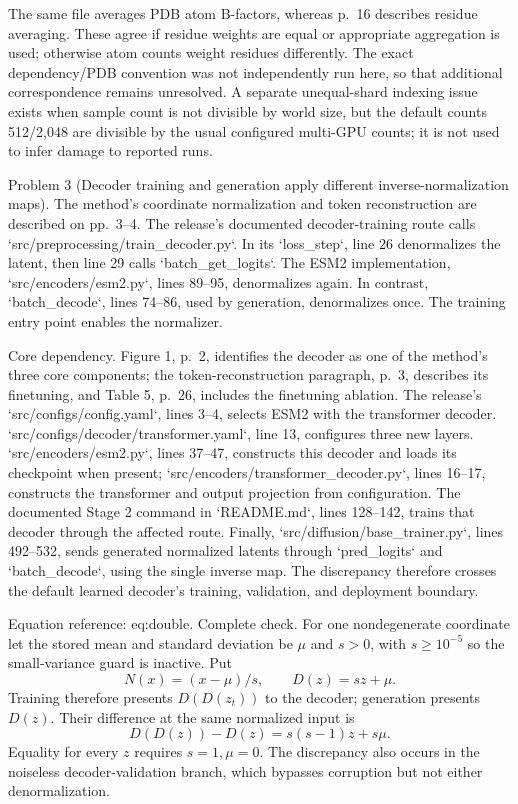 \documentclass[10pt]{article}
\begin{document}
The same file averages PDB atom B-factors, whereas p. 16 describes residue averaging. These agree if residue weights are equal or appropriate aggregation is used; otherwise atom counts weight residues differently. The exact dependency/PDB convention was not independently run here, so that additional correspondence remains unresolved. A separate unequal-shard indexing issue exists when sample count is not divisible by world size, but the default counts 512/2,048 are divisible by the usual configured multi-GPU counts; it is not used to infer damage to reported runs.\par
Problem 3 (Decoder training and generation apply different inverse-normalization maps).  The method’s coordinate normalization and token reconstruction are described on pp. 3–4. The release’s documented decoder-training route calls `src/preprocessing/train\_decoder.py`. In its `loss\_step`, line 26 denormalizes the latent, then line 29 calls `batch\_get\_logits`. The ESM2 implementation, `src/encoders/esm2.py`, lines 89–95, denormalizes again. In contrast, `batch\_decode`, lines 74–86, used by generation, denormalizes once. The training entry point enables the normalizer.\par
Core dependency. Figure 1, p. 2, identifies the decoder as one of the method’s three core components; the token-reconstruction paragraph, p. 3, describes its finetuning, and Table 5, p. 26, includes the finetuning ablation. The release’s `src/configs/config.yaml`, lines 3–4, selects ESM2 with the transformer decoder. `src/configs/decoder/transformer.yaml`, line 13, configures three new layers. `src/encoders/esm2.py`, lines 37–47, constructs this decoder and loads its checkpoint when present; `src/encoders/transformer\_decoder.py`, lines 16–17, constructs the transformer and output projection from configuration. The documented Stage 2 command in `README.md`, lines 128–142, trains that decoder through the affected route. Finally, `src/diffusion/base\_trainer.py`, lines 492–532, sends generated normalized latents through `pred\_logits` and `batch\_decode`, using the single inverse map. The discrepancy therefore crosses the default learned decoder’s training, validation, and deployment boundary.\par
Equation reference: eq:double. Complete check. For one nondegenerate coordinate let the stored mean and standard deviation be \(\mu\) and \(s>0\), with \(s\geq 10^{-5}\) so the small-variance guard is inactive. Put \[N(x)=(x-\mu)/s,\qquad D(z)=sz+\mu.\] Training therefore presents \(D(D(z_t))\) to the decoder; generation presents \(D(z)\). Their difference at the same normalized input is \[D(D(z))-D(z)=s(s-1)z+s\mu.
 \] Equality for every \(z\) requires \(s=1,\mu=0\). The discrepancy also occurs in the noiseless decoder-validation branch, which bypasses corruption but not either denormalization.\par
\end{document}
